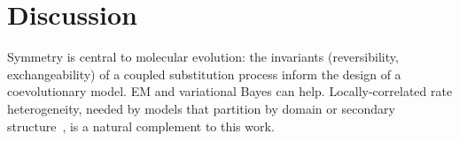 \documentclass{article}
\begin{document}

\section{Discussion}
\label{sec:discussion}

Symmetry is central to molecular evolution: the invariants (reversibility,
exchangeability) of a coupled substitution process inform the design of a coevolutionary
model. EM and variational Bayes can help.
Locally-correlated rate heterogeneity, needed by models that partition by domain or
secondary structure~\cite{LargeHolmes2026,ThorneGoldmanJones96,Yang1995}, is a natural
complement to this work.


\label{endofbody}
\clearpage


\end{document}
